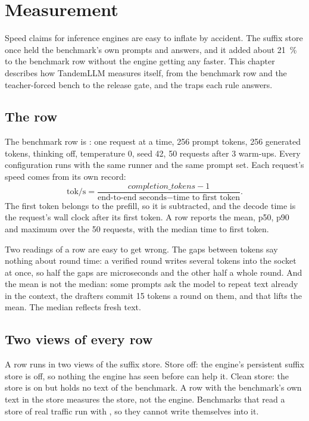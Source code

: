 \chapter{Measurement}\label{ch:measurement}

Speed claims for inference engines are easy to inflate by accident. The suffix store once held the benchmark's own prompts and answers, and it added about 21~\% to the benchmark row without the engine getting any faster. This chapter describes how TandemLLM measures itself, from the benchmark row and the teacher-forced bench to the release gate, and the traps each rule answers.

\section{The row}

The benchmark row is : one request at a time, 256 prompt tokens, 256 generated tokens, thinking off, temperature 0, seed 42, 50 requests after 3 warm-ups. Every configuration runs with the same runner and the same prompt set. Each request's speed comes from its own record:
\[
\text{tok/s} = \frac{\textit{completion\_tokens} - 1}{\text{end-to-end seconds} - \text{time to first token}}.
\]
The first token belongs to the prefill, so it is subtracted, and the decode time is the request's wall clock after its first token. A row reports the mean, p50, p90 and maximum over the 50 requests, with the median time to first token.

Two readings of a row are easy to get wrong. The gaps between tokens say nothing about round time: a verified round writes several tokens into the socket at once, so half the gaps are microseconds and the other half a whole round. And the mean is not the median: some prompts ask the model to repeat text already in the context, the drafters commit 15 tokens a round on them, and that lifts the mean. The median reflects fresh text.

\section{Two views of every row}

A row runs in two views of the suffix store. Store off: the engine's persistent suffix store is off, so nothing the engine has seen before can help it. Clean store: the store is on but holds no text of the benchmark. A row with the benchmark's own text in the store measures the store, not the engine. Benchmarks that read a store of real traffic run with , so they cannot write themselves into it.

